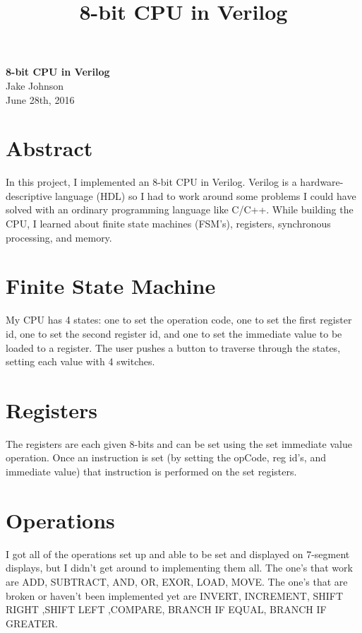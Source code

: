 \documentclass{article}
\title{8-bit CPU in Verilog}
\begin{document}
\begin{titlepage}
   \begin{center}
     \Large\textbf{8-bit CPU in Verilog}\\
     \large{Jake Johnson}\\
     \large{June 28th, 2016}
   \end{center}
\end{titlepage}

\section{Abstract}
In this project, I implemented an 8-bit CPU in Verilog.  Verilog is a hardware-descriptive language (HDL) so I had to work around some problems I could have solved with an ordinary programming language like C/C++.  While building the CPU, I learned about finite state machines (FSM's), registers, synchronous processing, and memory.

\section{Finite State Machine}
My CPU has 4 states: one to set the operation code, one to set the first register id, one to set the second register id, and one to set the immediate value to be loaded to a register.  The user pushes a button to traverse through the states, setting each value with 4 switches.

\section{Registers}
The registers are each given 8-bits and can be set using the set immediate value operation.  Once an instruction is set (by setting the opCode, reg id's, and immediate value) that instruction is performed on the set registers.

\section{Operations}
I got all of the operations set up and able to be set and displayed on 7-segment displays, but I didn't get around to implementing them all.  The one's that work are ADD, SUBTRACT, AND, OR, EXOR, LOAD, MOVE.  The one's that are broken or haven't been implemented yet are INVERT, INCREMENT, SHIFT RIGHT ,SHIFT LEFT ,COMPARE, BRANCH IF EQUAL, BRANCH IF GREATER.
\end{document}
